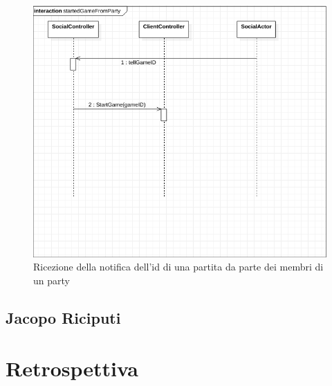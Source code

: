 \begin{figure}[H]
	\includegraphics[width=\textwidth,height=\textheight,keepaspectratio]{socialRecieveGame}
	\caption{Ricezione della notifica dell'id di una partita da parte dei membri di un party}
\end{figure}



 

 


        \subsection{Jacopo Riciputi}\label{subsec:riciputi}

        \clearpage

    \section{Retrospettiva}\label{sec:retrospective}


